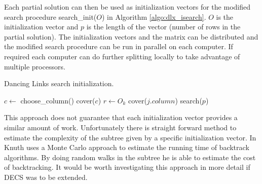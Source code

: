 Each partial solution can then be used as initialization vectors for the modified search procedure search\_init($O$) in Algorithm \ref{algo:dlx_isearch}.
$O$ is the initialization vector and $p$ is the length of the vector (number of rows in the partial solution).
The initialization vectors and the matrix can be distributed and the modified search procedure can be run in parallel on each computer.
If required each computer can do further splitting locally to take advantage of multiple processors.
\begin{algorithm}[H]
	\caption{Dancing Links search initialization.}
	\label{algo:dlx_isearch}
	\begin{distribalgo}[1]
				\STATE $c \leftarrow$ choose\_column()
				\STATE cover($c$)
				\STATE $r \leftarrow O_k$
					\STATE cover($j.column$)
				\ENDFOR
			\ENDFOR
			\STATE search($p$)  
		\ENDPROC
	\end{distribalgo}
\end{algorithm}

This approach does not guarantee that each initialization vector provides a similar amount of work.
Unfortunately there is straight forward method to estimate the complexity of the subtree given by a specific initialization vector.
In \cite{knuth75backtracking} Knuth uses a Monte Carlo approach to estimate the running time of backtrack algorithms.
By doing random walks in the subtree he is able to estimate the cost of backtracking.
It would be worth investigating this approach in more detail if DECS was to be extended.